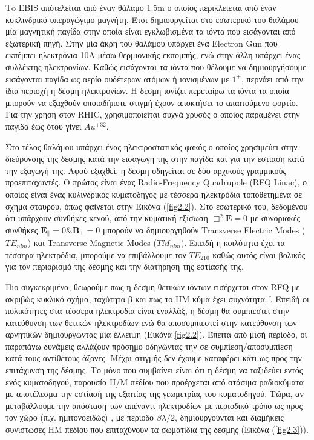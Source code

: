 	Τo EBIS απότελείται από έναν θάλαμο 1.5m ο οποίος περικλείεται από έναν κυκλινδρικό υπεραγώγιμο μαγνήτη. Έτσι δημιουργείται στο εσωτερικό του θαλάμου μία μαγνητική παγίδα στην οποία  είναι εγκλωβισμένα τα ιόντα που εισάγονται από εξωτερική πηγή. Στην μία άκρη του θαλάμου υπάρχει ένα Electron Gun που εκπέμπει ηλεκτρόνια 10Α μέσω θερμιονικής εκπομπής, ενώ στην άλλη υπάρχει ένας συλλέκτης ηλεκτρονίων. 
	Καθώς εισάγονται τα ιόντα που θέλουμε να δημιουργήσουμε εισάγονται παγίδα ως αερίο ουδέτερων ατόμων ή ιονισμένων με $1^+$, περνάει από την ίδια περιοχή η δέσμη ηλεκτρονίων. 
	Η δέσμη ιονίζει περεταίρω τα ιόντα τα οποία μπορούν να εξαχθούν οποιαδήποτε στιγμή έχουν αποκτήσει το απαιτούμενο φορτίο. Για την χρήση στον RHIC, χρησιμοποιείται συχνά χρυσός ο οποίος παραμένει στην παγίδα έως ότου γίνει $ Au^{+32}$.%
	
	Στο τέλος θαλάμου υπάρχει ένας ηλεκτροστατικός φακός ο οποίος χρησιμεύει στην διεύρυνσης της δέσμης κατά την εισαγωγή της στην παγίδα και για την εστίαση κατά την εξαγωγή της. Αφού εξαχθεί, η δέσμη οδηγείται σε δύο αρχικούς γραμμικούς προεπιταχυντές. Ο πρώτος είναι ένας Radio-Frequency Quadrupole (RFQ Linac), ο οποίος είναι ένας κυλινδρικός κυματοδηγός με τέσσερα ηλεκτρόδια τοποθετημένα σε σχήμα σταυρού, όπως φαίνεται στην Εικόνα (\ref{fig2.2}). Στο εσωτερικό του, δεδομένου ότι υπάρχουν συνθήκες κενού, από την κυματική εξίσωση  $\Box^2 \textbf{E}=0$ με συνοριακές συνθήκες $\textbf{E}_\parallel =0 \& \textbf{B}_\perp = 0$ μπορούν να δημιουργηθούν Transverse Electric Modes ($TE_{nlm}$) και Transverse Magnetic Mοdes ($TM_{nlm}$). Επειδή η κοιλότητα έχει τα τέσσερα ηλεκτρόδια, μπορούμε να επιβάλλουμε τον $TE_{210}$ καθώς αυτός είναι βολικός για τον περιορισμό της δέσμης και την διατήρηση της εστίασής της.
	
	Πιο συγκεκριμένα, θεωρούμε πως η δέσμη θετικών ιόντων εισέρχεται στον RFQ με ακριβώς κυκλικό σχήμα, ταχύτητα β και πως το ΗΜ κύμα έχει συχνότητα f. Επειδή οι πολικότητες στα τέσσερα ηλεκτρόδια είναι εναλλάξ, η δέσμη θα συμπιεστεί στην κατεύθυνση των θετικών ηλεκτροδίων ενώ θα αποσυμπιεστεί στην κατεύθυνση των αρνητικών δημιουργώντας μία έλλειψη (Εικόνα \ref{fig2.2}). Έπειτα από μισή περίοδο, οι παραπάνω δυνάμεις αλλάζουν πρόσημο οδηγώντας την σε συμπίεση/αποσυμπίεση κατά τους αντίθετους άξονες. 
	Μέχρι στιγμής δεν έχουμε καταφέρει κάτι ως προς την επιτάχυνση της δέσμης. Το μόνο που συμβαίνει είναι ότι η δέσμη να ταξιδεύει εντός ενός κυματοδηγού, παρουσία Η/Μ πεδίου που προέρχεται από στάσιμα ραδιοκύματα με αποτέλεσμα την εστίασή της εξαιτίας της γεωμετρίας του κυματοδηγού. Τώρα, αν μεταβάλλουμε την απόσταση των απέναντι ηλεκτροδίων με περιοδικό τρόπο ως προς τον χώρο (π.χ. ημιτονοειδώς) , με περίοδο $\beta\lambda/2$, δημιουργούνται και διαμήκεις συνιστώσες ΗΜ πεδίου που επιταχύνουν τα σωματίδια της δέσμης (Εικόνα (\ref{fig2.3})).
	
